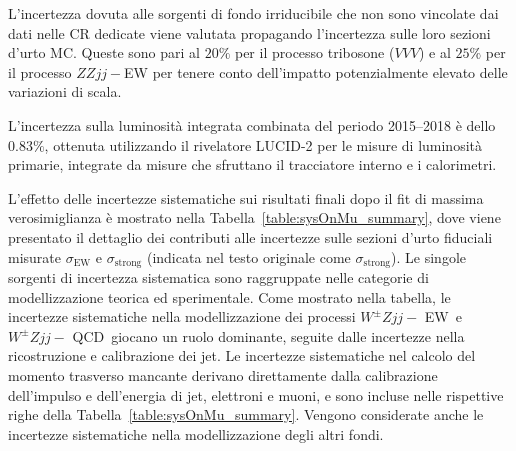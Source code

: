 \documentclass[11pt]{article}
\newcommand{\wzjjew}{$W^\pm Z jj-$ EW}
\newcommand{\wzjjqcd}{$W^\pm Z jj-$ QCD}
\begin{document}
L'incertezza dovuta alle sorgenti di fondo irriducibile che non sono vincolate dai dati nelle CR dedicate viene valutata propagando l'incertezza sulle loro sezioni d'urto MC. Queste sono pari al $20\%$ per il processo tribosone ($VVV$) e al $25\%$ per il processo $ZZjj-$EW per tenere conto dell'impatto potenzialmente elevato delle variazioni di scala.

L'incertezza sulla luminosità integrata combinata del periodo 2015–2018 è dello $0.83\%$, ottenuta utilizzando il rivelatore LUCID-2 per le misure di luminosità primarie, integrate da misure che sfruttano il tracciatore interno e i calorimetri.

L'effetto delle incertezze sistematiche sui risultati finali dopo il fit di massima verosimiglianza è mostrato nella Tabella~\ref{table:sysOnMu_summary}, dove viene presentato il dettaglio dei contributi alle incertezze sulle sezioni d'urto fiduciali misurate $\sigma_{\text{EW}}$ e $\sigma_{\text{strong}}$ (indicata nel testo originale come $\sigma_{\text{strong}}$). Le singole sorgenti di incertezza sistematica sono raggruppate nelle categorie di modellizzazione teorica ed sperimentale. Come mostrato nella tabella, le incertezze sistematiche nella modellizzazione dei processi \wzjjew\ e \wzjjqcd\ giocano un ruolo dominante, seguite dalle incertezze nella ricostruzione e calibrazione dei jet. Le incertezze sistematiche nel calcolo del momento trasverso mancante derivano direttamente dalla calibrazione dell'impulso e dell'energia di jet, elettroni e muoni, e sono incluse nelle rispettive righe della Tabella~\ref{table:sysOnMu_summary}. Vengono considerate anche le incertezze sistematiche nella modellizzazione degli altri fondi.
\end{document}
